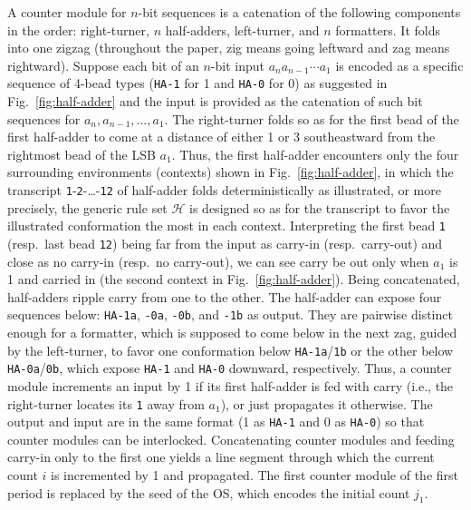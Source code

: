 A counter module for $n$-bit sequences is a catenation of the following components in the order: right-turner, $n$ half-adders, left-turner, and $n$ formatters. 
It folds into one zigzag (throughout the paper, zig means going leftward and zag means rightward). 
Suppose each bit of an $n$-bit input $a_n a_{n-1} \cdots a_1$ is encoded as a specific sequence of 4-bead types ({\tt HA-1} for 1 and {\tt HA-0} for 0) as suggested in Fig.~\ref{fig:half-adder} and the input is provided as the catenation of such bit sequences for $a_n, a_{n-1}, \ldots, a_1$. 
The right-turner folds so as for the first bead of the first half-adder to come at a distance of either 1 or 3 southeastward from the rightmost bead of the LSB $a_1$. 
Thus, the first half-adder encounters only the four surrounding environments (contexts) shown in Fig.~\ref{fig:half-adder}, in which the transcript {\tt 1}-{\tt 2}-\dots-{\tt 12} of half-adder folds deterministically as illustrated, or more precisely, the generic rule set $\mathcal{H}$ is designed so as for the transcript to favor the illustrated conformation the most in each context. 
Interpreting the first bead {\tt 1} (resp.~last bead {\tt 12}) being far from the input as carry-in (resp.~carry-out) and close as no carry-in (resp.~no carry-out), we can see carry be out only when $a_1$ is 1 and carried in (the second context in Fig.~\ref{fig:half-adder}). 
Being concatenated, half-adders ripple carry from one to the other. 
The half-adder can expose four sequences below: {\tt HA-1a}, {\tt -0a}, {\tt -0b}, and {\tt -1b} as output. 
They are pairwise distinct enough for a formatter, which is supposed to come below in the next zag, guided by the left-turner, to favor one conformation below {\tt HA-1a}/{\tt 1b} or the other  below {\tt HA-0a}/{\tt 0b}, which expose {\tt HA-1} and {\tt HA-0} downward, respectively. 
Thus, a counter module increments an input by 1 if its first half-adder is fed with carry (i.e., the right-turner locates its {\tt 1} away from $a_1$), or just propagates it otherwise. 
The output and input are in the same format (1 as {\tt HA-1} and 0 as {\tt HA-0}) so that counter modules can be interlocked. 
Concatenating counter modules and feeding carry-in only to the first one yields a line segment through which the current count $i$ is incremented by 1 and propagated. 
The first counter module of the first period is replaced by the seed of the OS, which encodes the initial count $j_1$. 

